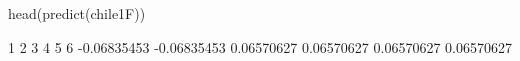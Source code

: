 \begin{Schunk}
\begin{Sinput}
 head(predict(chile1F))
\end{Sinput}
\begin{Soutput}
          1           2           3           4           5           6 
-0.06835453 -0.06835453  0.06570627  0.06570627  0.06570627  0.06570627 
\end{Soutput}
\end{Schunk}
